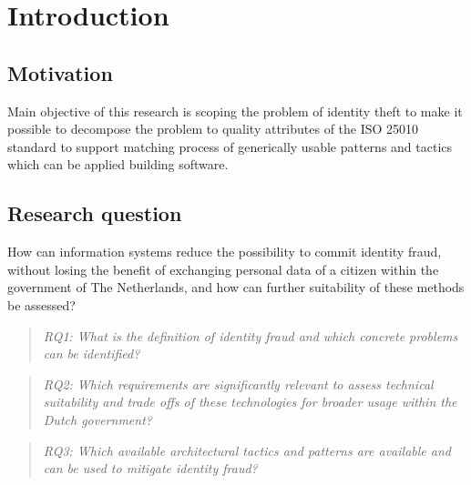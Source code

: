 \chapter{Introduction}\label{s:intro}


\section{Motivation}
Main objective of this research is scoping the problem of identity theft to make it possible to decompose the problem to quality attributes of the ISO 25010 standard \cite{ISO:25010:2011} to support matching process of generically usable patterns and tactics which can be applied building software.

\section{Research question}
How can information systems reduce the possibility to commit identity fraud, without losing the benefit of exchanging personal data of a citizen within the government of The Netherlands, and how can further suitability of these methods be assessed?

\begin{quote}\emph{RQ1: What is the definition of identity fraud and which concrete problems can be identified?}\end{quote}
\begin{quote}\emph{RQ2: Which requirements are significantly relevant to assess technical suitability and trade offs of these technologies for broader usage within the Dutch government?}\end{quote}
\begin{quote}\emph{RQ3: Which available architectural tactics and patterns are available and can be used to mitigate identity fraud?}\end{quote}

\break

